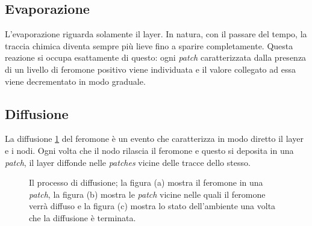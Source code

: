 \subsection{Evaporazione}
L'evaporazione riguarda solamente il layer. In natura, con il passare del tempo, la traccia chimica diventa sempre più
lieve fino a sparire completamente. Questa reazione si occupa esattamente di questo: ogni \textit{patch} caratterizzata
dalla presenza di un livello di feromone positivo viene individuata e il valore collegato ad essa viene decrementato in modo graduale.
\subsection{Diffusione}
La diffusione \cref{fig:diffusion} del feromone è un evento che caratterizza in modo diretto il layer e i nodi. Ogni volta che il nodo rilascia il feromone e
questo si deposita in una \textit{patch}, il layer diffonde nelle \textit{patches} vicine delle tracce dello stesso.
\begin{figure}[ht]
    \centering
    \caption{Il processo di diffusione; la figura (a) mostra il feromone in una \textit{patch}, la figura (b) mostra le \textit{patch} vicine nelle 
    quali il feromone verrà diffuso e la figura (c) mostra lo stato dell'ambiente una volta che la diffusione è terminata.}\label{fig:diffusion}
\end{figure}

